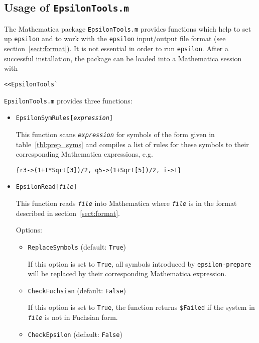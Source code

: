 \documentclass[12pt]{article}
\numberwithin{equation}{section}
\numberwithin{figure}{section}
\begin{document}
    \subsection{Usage of \texttt{EpsilonTools.m}}
      The Mathematica package \texttt{EpsilonTools.m} provides functions which help to set up \texttt{epsilon} and to work with the \texttt{epsilon} input/output file format (see section~\ref{sect:format}).
      It is not essential in order to run \texttt{epsilon}.
      After a successful installation, the package can be loaded into a Mathematica session with
      \begin{lstlisting}[basicstyle=\ttfamily,xleftmargin=-4em]
        <<EpsilonTools`
      \end{lstlisting}
      \texttt{EpsilonTools.m} provides three functions:
      \begin{itemize}
        \item
          \texttt{EpsilonSymRules[\textit{expression}]}

          This function scans \texttt{\textit{expression}} for symbols of the form given in table~\ref{tbl:prep_syms} and compiles a list of rules for these symbols to their corresponding Mathematica expressions, e.g.
          \begin{lstlisting}[basicstyle=\ttfamily,xleftmargin=-4em]
            {r3->(1+I*Sqrt[3])/2, q5->(1+Sqrt[5])/2, i->I}
          \end{lstlisting}          
        \item
          \texttt{EpsilonRead[\textit{file}]}
    
          This function reads \texttt{\textit{file}} into Mathematica where \texttt{\textit{file}} is in the format described in section~\ref{sect:format}.
          
          Options:
          \begin{itemize}
            \item 
              \texttt{ReplaceSymbols} (default: \texttt{True})

              If this option is set to \texttt{True}, all symbols introduced by \texttt{epsilon-prepare} will be replaced by their corresponding Mathematica expression.
            \item
              \texttt{CheckFuchsian} (default: \texttt{False})

              If this option is set to \texttt{True}, the function returns \texttt{\$Failed} if the system in \texttt{\textit{file}} is not in Fuchsian form.
            \item
              \texttt{CheckEpsilon} (default: \texttt{False})
              

\end{itemize}
\end{itemize}
\end{document}

